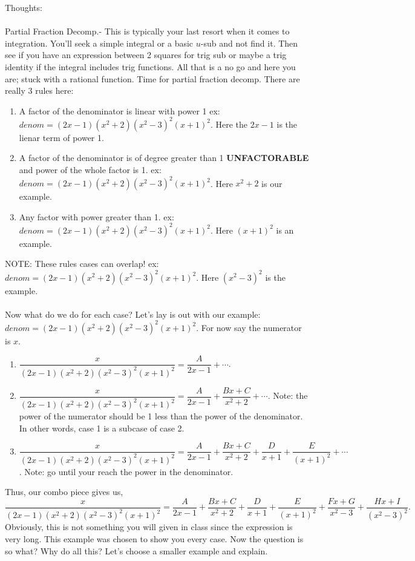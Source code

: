 \documentclass[10pt]{article}
\theoremstyle{Theorem}
\theoremstyle{definition}
\theoremstyle{remark}
\theoremstyle{custom}
\begin{document}
\thispagestyle{firststyle}
\pagestyle{plain}


Thoughts:\\\\
Partial Fraction Decomp.- This is typically your last resort when it comes to integration. You'll seek a simple integral or a basic $u$-sub and not find it. Then see if you have an expression between 2 squares for trig sub or maybe a trig identity if the integral includes trig functions. All that is a no go and here you are; stuck with a rational function.  Time for partial fraction decomp.  There are really 3 rules here:
\begin{enumerate}[1.]
\item A factor of the denominator is linear with power 1 ex: $denom=(2x-1)(x^2+2)(x^2-3)^2(x+1)^2$. Here the $2x-1$ is the lienar term of power 1.
\item A factor of the denominator is of degree greater than 1 \textbf{UNFACTORABLE} and power of the whole factor is 1. ex: $denom=(2x-1)(x^2+2)(x^2-3)^2(x+1)^2$. Here $x^2+2$ is our example.
\item Any factor with power greater than 1. ex: $denom=(2x-1)(x^2+2)(x^2-3)^2(x+1)^2$. Here $(x+1)^2$ is an example.
\end{enumerate}
NOTE: These rules cases can overlap! ex: $denom=(2x-1)(x^2+2)(x^2-3)^2(x+1)^2$. Here $(x^2-3)^2$ is the example.\\\\
Now what do we do for each case? Let's lay is out with our example: $denom=(2x-1)(x^2+2)(x^2-3)^2(x+1)^2$. For now say the numerator is $x$.
\begin{enumerate}[1.]
\item $\dfrac{x}{(2x-1)(x^2+2)(x^2-3)^2(x+1)^2}=\dfrac{A}{2x-1}+\cdots$.
\item $\dfrac{x}{(2x-1)(x^2+2)(x^2-3)^2(x+1)^2}=\dfrac{A}{2x-1}+\dfrac{Bx+C}{x^2+2}+\cdots.$ Note: the power of the numerator should be 1 less than the power of the denominator. In other words, case 1 is a subcase of case 2.
\item $\dfrac{x}{(2x-1)(x^2+2)(x^2-3)^2(x+1)^2}=\dfrac{A}{2x-1}+\dfrac{Bx+C}{x^2+2}+\dfrac{D}{x+1}+\dfrac{E}{(x+1)^2}+ \cdots$. Note: go until your reach the power in the denominator.
\end{enumerate}
Thus, our combo piece gives us, $$\dfrac{x}{(2x-1)(x^2+2)(x^2-3)^2(x+1)^2}=\dfrac{A}{2x-1}+\dfrac{Bx+C}{x^2+2}+\dfrac{D}{x+1}+\dfrac{E}{(x+1)^2}+\dfrac{Fx+G}{x^2-3}+\dfrac{Hx+I}{(x^2-3)^2}.$$
Obviously, this is not something you will given in class since the expression is very long. This example was chosen to show you every case. Now the question is so what? Why do all this? Let's choose a smaller example and explain.
\end{document}
